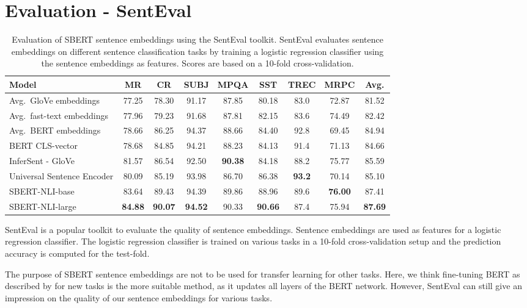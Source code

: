\documentclass[11pt,a4paper]{article}
\begin{document}
\section{Evaluation - SentEval} \label{sec_eval_senteval}
\begin{table*}[t]
	\centering 
	\footnotesize
	\begin{tabular}{|l|c|c|c|c|c|c|c||c|}
		\hline
		\textbf{Model} & \textbf{MR} & \textbf{CR} & \textbf{SUBJ} & \textbf{MPQA} & \textbf{SST} & \textbf{TREC} & \textbf{MRPC} & \textbf{Avg.} \\ \hline
		Avg.\ GloVe embeddings & 77.25 & 78.30 & 91.17 & 87.85 & 80.18 & 83.0 & 72.87 & 81.52 \\
		Avg.\ fast-text embeddings & 77.96 & 79.23 & 91.68 & 87.81 & 82.15 & 83.6 & 74.49 & 82.42 \\
		Avg.\ BERT embeddings & 78.66 & 86.25 & 94.37 & 88.66 &  84.40 & 92.8 & 69.45 & 84.94 \\
		BERT CLS-vector & 78.68 & 84.85 & 94.21 & 88.23 & 84.13 & 91.4 & 71.13 &  84.66 \\
		InferSent - GloVe & 81.57 & 86.54 & 92.50 & \textbf{90.38} & 84.18 & 88.2 & 75.77 & 85.59 \\
		Universal Sentence Encoder & 80.09 & 85.19 & 93.98 & 86.70 & 86.38 & \textbf{93.2} & 70.14 & 85.10 \\ \hline
		SBERT-NLI-base & 83.64 & 89.43 & 94.39 & 89.86 & 88.96 & 89.6 & \textbf{76.00} & 87.41 \\
		SBERT-NLI-large & \textbf{84.88} & \textbf{90.07} & \textbf{94.52} & 90.33 & \textbf{90.66} & 87.4 & 75.94 & \textbf{87.69} \\ \hline	
	\end{tabular}
	\caption{Evaluation of SBERT sentence embeddings using the SentEval toolkit. SentEval evaluates sentence embeddings on different sentence classification tasks by training a logistic regression classifier using the sentence embeddings as features. Scores are based on a 10-fold cross-validation.}
	\label{table_senteval}
\end{table*}


SentEval \cite{conneau2018senteval} is a popular toolkit to evaluate the quality of sentence embeddings. Sentence embeddings are used as features for a logistic regression classifier. The logistic regression classifier is trained on various tasks in a 10-fold cross-validation setup and the prediction accuracy is computed for the test-fold. 

The purpose of SBERT sentence embeddings are not to be used for transfer learning for other tasks. Here, we think fine-tuning BERT as described by  for new tasks is the more suitable method, as it updates all layers of the BERT network. However, SentEval can still give an impression on the quality of our sentence embeddings for various tasks.
\end{document}
